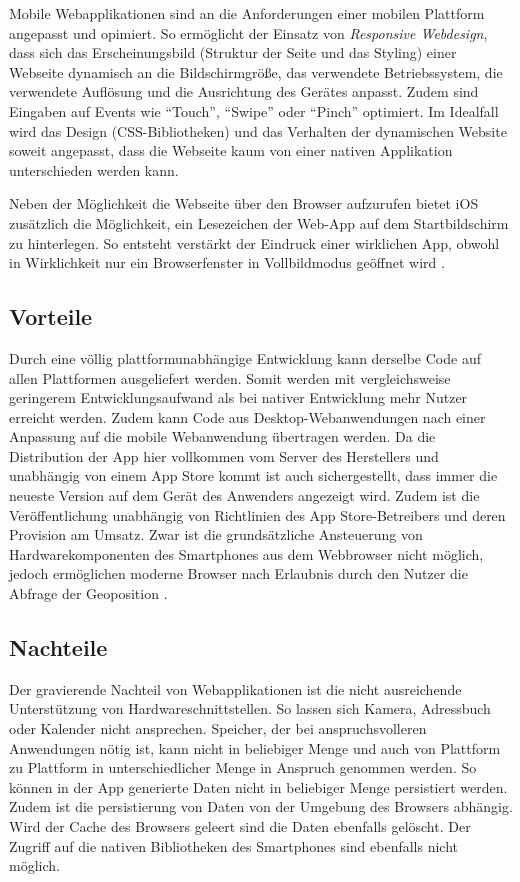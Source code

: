 Mobile Webapplikationen sind an die Anforderungen einer mobilen Plattform angepasst und opimiert. So ermöglicht der Einsatz von \emph{Responsive Webdesign}, dass sich das Erscheinungsbild (Struktur der Seite und das Styling) einer Webseite dynamisch an die Bildschirmgröße, das verwendete Betriebssystem, die verwendete Auflösung und die Ausrichtung des Gerätes anpasst. Zudem sind Eingaben auf Events wie \enquote{Touch}, \enquote{Swipe} oder \enquote{Pinch} optimiert. Im Idealfall wird das Design (CSS-Bibliotheken) und das Verhalten der dynamischen Website soweit angepasst, dass die Webseite kaum von einer nativen Applikation unterschieden werden kann. 

Neben der Möglichkeit die Webseite über den Browser aufzurufen bietet iOS zusätzlich die Möglichkeit, ein Lesezeichen der Web-App auf dem Startbildschirm zu hinterlegen. So entsteht verstärkt der Eindruck einer wirklichen App, obwohl in Wirklichkeit nur ein Browserfenster in Vollbildmodus geöffnet wird \cite{safariRef}.
%
\subsection{Vorteile}
%
Durch eine völlig plattformunabhängige Entwicklung kann derselbe Code auf allen Plattformen ausgeliefert werden. Somit werden mit vergleichsweise geringerem Entwicklungsaufwand als bei nativer Entwicklung mehr Nutzer erreicht werden. Zudem kann Code aus Desktop-Webanwendungen nach einer Anpassung auf die mobile Webanwendung übertragen werden. Da die Distribution der App hier vollkommen vom Server des Herstellers und unabhängig von einem App Store kommt ist auch sichergestellt, dass immer die neueste Version auf dem Gerät des Anwenders angezeigt wird. Zudem ist die Veröffentlichung unabhängig von Richtlinien des App Store-Betreibers und deren Provision am Umsatz. Zwar ist die grundsätzliche Ansteuerung von Hardwarekomponenten des Smartphones aus dem Webbrowser nicht möglich, jedoch ermöglichen moderne Browser nach Erlaubnis durch den Nutzer die Abfrage der Geoposition \cite{browserGPS}.
%
\subsection{Nachteile}
%
Der gravierende Nachteil von Webapplikationen ist die nicht ausreichende Unterstützung von Hardwareschnittstellen. So lassen sich Kamera, Adressbuch oder Kalender nicht ansprechen. Speicher, der bei anspruchsvolleren Anwendungen nötig ist, kann nicht in beliebiger Menge und auch von Plattform zu Plattform in unterschiedlicher Menge in Anspruch genommen werden. So können in der App generierte Daten nicht in beliebiger Menge persistiert werden. Zudem ist die persistierung von Daten von der Umgebung des Browsers abhängig. Wird der Cache des Browsers geleert sind die Daten ebenfalls gelöscht. Der Zugriff auf die nativen Bibliotheken des Smartphones sind ebenfalls nicht möglich.
%
%
